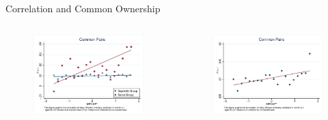 \documentclass[handout]{beamer}
\begin{document}
	\begin{frame}{Correlation and Common Ownership}
		\label{Monthly16} 
		\begin{columns}
			\begin{figure}   
				\centering
				\includegraphics[width=\linewidth]{"Output/mcorr5bg.eps"}     \end{figure}            
			\begin{figure}
				\centering  
				\includegraphics[width=\linewidth]{"Output/mcorr5l.eps"}
			\end{figure}
		\end{columns}
		
		
	\end{frame}
	
\end{document}
